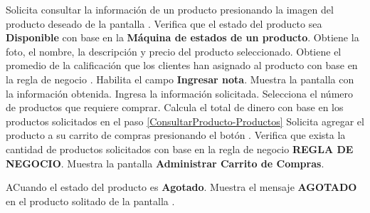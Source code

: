 	
	\begin{UCtrayectoria}
		\UCpaso[\UCactor] Solicita consultar la información de un producto presionando la imagen del producto deseado de la pantalla .
		\UCpaso Verifica que el estado del producto sea \textbf{Disponible} con base en la   \textbf{Máquina de estados de un producto}. 
		\UCpaso Obtiene la foto, el nombre, la descripción y precio del producto seleccionado.
		\UCpaso Obtiene el promedio de la calificación que los clientes han asignado al producto con base en la regla de negocio .
		\UCpaso Habilita el campo \textbf{Ingresar nota}.
		\UCpaso Muestra la pantalla  con la información obtenida.
		\UCpaso [\UCactor] Ingresa la información solicitada.
		\UCpaso [\UCactor] \label{ConsultarProducto-Productos} Selecciona el número de productos que requiere comprar.
		\UCpaso Calcula el total de dinero con base en los productos solicitados en el paso \ref{ConsultarProducto-Productos}
		\UCpaso [\UCactor] Solicita agregar el producto a su carrito de compras presionando el botón .
		\UCpaso Verifica que exista la cantidad de productos solicitados con base en la regla de negocio \textbf{REGLA DE NEGOCIO}.
		\UCpaso Muestra la pantalla \textbf{Administrar Carrito de Compras}.
	\end{UCtrayectoria}
	

	\begin{UCtrayectoriaA}{A}{Cuando el estado del producto es \textbf{Agotado}.} 
		\UCpaso Muestra el mensaje \textbf{AGOTADO} en el producto solitado de la pantalla .
	
	\end{UCtrayectoriaA}
	